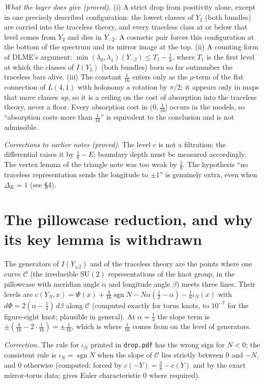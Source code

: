 \documentclass[10pt]{amsart}
\numberwithin{equation}{section}
\newcommand{\st}[1]{\par\noindent\textit{#1}\enspace}
\newcommand{\SU}{\mathrm{SU}}
\begin{document}
\st{What the layer does give (proved).} (i) A strict drop from positivity
alone, except in one precisely described configuration: the lowest classes
of $Y_2$ (both bundles) are carried into the traceless theory, and every
traceless class at or below that level comes from $Y_2$ and dies in
$Y_{-2}$. A cosmetic pair forces this configuration at the bottom of the
spectrum and its mirror image at the top. (ii) A counting form of DLME's
argument: $\min(\lambda_0,\lambda_1)(Y_{-2})\le T_1-\frac18$, where $T_1$ is
the first level at which the classes of $I(Y_2)$ (both bundles) born so far
outnumber the traceless bars alive. (iii) The constant $\frac1{16}$ enters
only as the $\rho$-term of the flat connection of $L(4,1)$ with holonomy a
rotation by $\pi/2$; it appears only in maps that move classes \emph{up}, so
it is a ceiling on the cost of absorption into the traceless theory, never
a floor. Every absorption cost in $(0,\frac1{16}]$ occurs in the models, so
``absorption costs more than $\frac1{16}$'' is equivalent to the conclusion
and is not admissible.

\st{Corrections to earlier notes (proved).} The level $c$ is not a
filtration: the differential raises it by $\frac18-E$; boundary depth must be
measured accordingly. The vertex lemma of the triangle note was too weak by
$\frac18$. The hypothesis ``no traceless representation sends the longitude
to $\pm1$'' is genuinely extra, even when $\Delta_K=1$ (see \S4).

\section{The pillowcase reduction, and why its key lemma is withdrawn}

The generators of $I(Y_{\pm2})$ and of the traceless theory are the points
where one curve $\mathcal C$ (the irreducible $\SU(2)$ representations of
the knot group, in the pillowcase with meridian angle $\alpha$ and longitude
angle $\beta$) meets three lines. Their levels are
$c(Y_N,x)=\Phi(x)+\frac3{16}\operatorname{sgn}N-N\alpha(\frac12-\alpha)
-\frac18\iota_N(x)$ with $d\Phi=2(\alpha-\frac14)\,d\beta$ along
$\mathcal C$ (computed exactly for torus knots, to $10^{-7}$ for the
figure-eight knot; plausible in general). At $\alpha=\frac14$ the slope term
is $\pm(\frac3{16}-2\cdot\frac1{16})=\pm\frac1{16}$, which is where
$\frac1{16}$ comes from on the level of generators.

\st{Correction.} The rule for $\iota_N$ printed in \texttt{drop.pdf} has the
wrong sign for $N<0$; the consistent rule is $\iota_N=\operatorname{sgn}N$
when the slope of $\mathcal C$ lies strictly between $0$ and $-N$, and $0$
otherwise (computed: forced by $c(-Y)=\frac38-c(Y)$ and by the exact
mirror-torus data; gives Euler characteristic $0$ where required).
\end{document}
